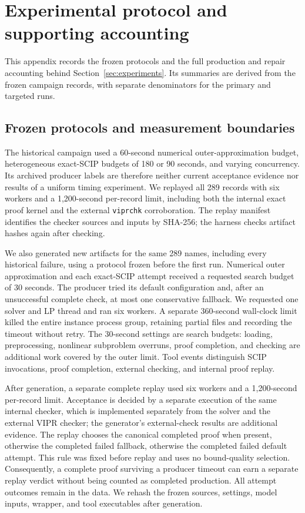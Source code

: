 \section{Experimental protocol and supporting accounting}
\label{app:experimental-accounting}

This appendix records the frozen protocols and the full production and repair
accounting behind Section~\ref{sec:experiments}. Its summaries are derived from
the frozen campaign records, with separate denominators for the primary and
targeted runs.

\subsection{Frozen protocols and measurement boundaries}

The historical campaign used a 60-second numerical outer-approximation budget,
heterogeneous exact-SCIP budgets of 180 or 90 seconds, and varying concurrency.
Its archived producer labels are therefore neither current acceptance evidence
nor results of a uniform timing experiment. We replayed all 289 records with
six workers and a 1,200-second per-record limit, including both the internal
exact proof kernel and the external \texttt{viprchk} corroboration. The replay
manifest identifies the checker sources and inputs by SHA-256; the harness
checks artifact hashes again after checking.

We also generated new artifacts for the same 289 names, including every
historical failure, using a protocol frozen before the first run. Numerical
outer approximation and each exact-SCIP attempt received a requested search
budget of 30 seconds. The producer tried its default configuration and, after
an unsuccessful complete check, at most one conservative fallback. We requested
one solver and LP thread and ran six workers. A separate 360-second wall-clock
limit killed the entire instance process group, retaining partial files and
recording the timeout without retry. The 30-second settings are search budgets:
loading, preprocessing, nonlinear subproblem overruns, proof completion, and
checking are additional work covered by the outer limit. Tool events distinguish
SCIP invocations, proof completion, external checking, and internal proof replay.

After generation, a separate complete replay used six workers and a
1,200-second per-record limit. Acceptance is decided by a separate execution
of the same internal checker, which is implemented separately from the solver
and the external VIPR checker; the generator's external-check results are
additional evidence.
The replay chooses the canonical completed proof when present, otherwise the
completed failed fallback, otherwise the completed failed default attempt.
This rule was fixed before replay and uses no bound-quality selection.
Consequently, a complete proof surviving a producer timeout can earn a
separate replay verdict without being counted as completed production.
All attempt outcomes remain in the data. We rehash the frozen sources, settings,
model inputs, wrapper, and tool executables after generation.


